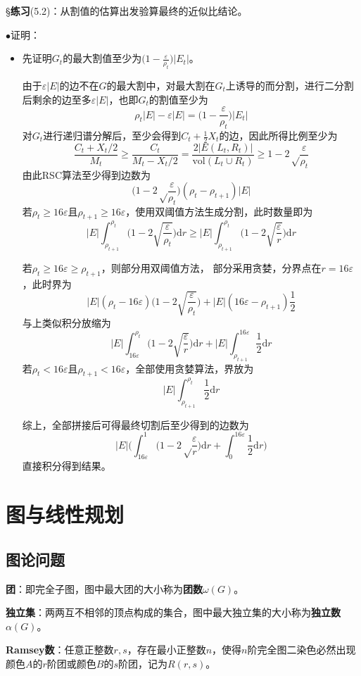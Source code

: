 \documentclass[a4paper,UTF8,fontset=windows]{ctexart}
\newcommand{\exce}[2]{\S\textbf{练习}(#1)：{\kaishu #2}}
\newcommand{\proo}[1]{{\kaishu $\bullet$证明：
\begin{itemize}
    \item[] #1
\end{itemize}
}}
\begin{document}
\exce{5.2}{从割值的估算出发验算最终的近似比结论。}

\proo{
    先证明$G_t$的最大割值至少为$\big(1-\frac{\varepsilon}{\rho_t}\big)|E_t|$。

    由于$\varepsilon|E|$的边不在$G$的最大割中，对最大割在$G_t$上诱导的而分割，进行二分割后剩余的边至多$\varepsilon|E|$，也即$G_t$的割值至少为
    $$\rho_t|E|-\varepsilon|E|=\bigg(1-\frac{\varepsilon}{\rho_t}\bigg)|E_t|$$
    对$G_t$进行递归谱分解后，至少会得到$C_t+\frac{1}{2}X_t$的边，因此所得比例至少为
    $$\frac{C_t+X_t/2}{M_t}\ge\frac{C_t}{M_t-X_t/2}=\frac{2|E(L_t,R_t)|}{\mathrm{vol}(L_t\cup R_t)}\ge1-2\sqrt\frac{\varepsilon}{\rho_t}$$
    由此RSC算法至少得到边数为
    $$\bigg(1-2\sqrt\frac{\varepsilon}{\rho_t}\bigg)(\rho_t-\rho_{t+1})|E|$$
    若$\rho_t\ge16\varepsilon$且$\rho_{t+1}\ge16\varepsilon$，使用双阈值方法生成分割，此时数量即为
    $$|E|\int_{\rho_{t+1}}^{\rho_t}\bigg(1-2\sqrt{\frac{\varepsilon}{\rho_t}}\bigg)\mathrm{d}r\ge|E|\int_{\rho_{t+1}}^{\rho_t}\bigg(1-2\sqrt{\frac{\varepsilon}{r}}\bigg)\mathrm{d}r$$

    若$\rho_t\ge16\varepsilon\ge\rho_{t+1}$，则部分用双阈值方法， 部分采用贪婪，分界点在$r=16\varepsilon$，此时界为
    $$|E|(\rho_t-16\varepsilon)\bigg(1-2\sqrt{\frac{\varepsilon}{\rho_t}}\bigg)+|E|(16\varepsilon-\rho_{t+1})\frac{1}{2}$$
    与上类似积分放缩为
    $$|E|\int_{16\varepsilon}^{\rho_t}\bigg(1-2\sqrt{\frac{\varepsilon}{r}}\bigg)\mathrm{d}r+|E|\int_{\rho_{t+1}}^{16\varepsilon}\frac{1}{2}\mathrm{d}r$$
    若$\rho_t<16\varepsilon$且$\rho_{t+1}<16\varepsilon$，全部使用贪婪算法，界放为
    $$|E|\int_{\rho_{t+1}}^{\rho_t}\frac{1}{2}\mathrm{d}r$$

    综上，全部拼接后可得最终切割后至少得到的边数为
    $$|E|\bigg(\int_{16\varepsilon}^1\bigg(1-2\sqrt\frac{\varepsilon}{r}\bigg)\mathrm{d}r+\int_0^{16\varepsilon}\frac{1}{2}\mathrm{d}r\bigg)$$
    直接积分得到结果。
}

\section{图与线性规划}
\subsection{图论问题}
\textbf{团}：即完全子图，图中最大团的大小称为\textbf{团数}$\omega(G)$。

\textbf{独立集}：两两互不相邻的顶点构成的集合，图中最大独立集的大小称为\textbf{独立数}$\alpha(G)$。

\textbf{Ramsey数}：任意正整数$r,s$，存在最小正整数$n$，使得$n$阶完全图二染色必然出现颜色$A$的$r$阶团或颜色$B$的$s$阶团，记为$R(r,s)$。
\end{document}
